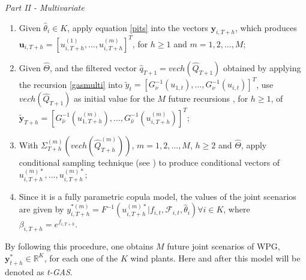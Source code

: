 \documentclass[a4paper]{IEEEtran}
\begin{document}
\emph{Part II - Multivariate}
\begin{enumerate}\label{multivariate_modelling}

\item Given $\hat{\theta}_i \in K$, apply equation \eqref{pits} into the vectors $\mathbf{y}_{i,T+h}$, which produces $\mathbf{u}_{i,T+h} = [u_{i,T+h}^{(1)},...,u_{i,T+h}^{(m)}]^T$, for $h \geq 1$ and $m=1,2,...,M$; \label{step1_multi} %

\item Given $\hat{\Theta}$, and the filtered vector $\hat{q}_{T+1} = vech(\hat{Q}_{T+1})$ obtained by applying the recursion \eqref{gasmulti} into $\tilde{y}_{t}=[G_{\nu}^{-1}(u_{1,t}), ..., G_{\nu}^{-1}(u_{i,t})]^T$, use $vech(\hat{Q}_{T+1})$ as initial value for the $M$ future recursions , for $h \geq 1$, of  $\mathbf{\tilde{y}}_{T+h} = [G^{-1}_{\hat{\nu}}(u_{1,T+h}^{(m)}),...,G^{-1}_{\hat{\nu}}(u_{i,T+h}^{(m)})]^T$; \label{step2_multi}


\item With $\Sigma_{T+h}^{(m)}(vech(\hat{Q}_{T+h}^{(m)}))$, $m=1,2,...,M$, $h \geq 2$ and $\hat{\Theta}$, apply conditional sampling technique (see \cite{cherubini2004copula}) to produce conditional vectors of ${u}_{i,T+h}^{(m)*},...,{u}_{i,T+h}^{(m)*}$; \label{step3_multi}

\item Since it is a fully parametric copula model, the values of the joint scenarios are given by $y^{*(m)}_{i,T+h}=F^{-1}(u_{i,T+h}^{(m)*}| f_{i,t},\mathcal{F}_{i,t},\hat{\theta}_{i}) \forall i \in K$, where $\beta_{i,T+h}=e^{f_{i,T+h}}$. \label{step4_multi}

\end{enumerate}

By following this procedure, one obtains $M$ future joint scenarios of WPG, $\mathbf{y}_{t+h}^{*} \in \mathbb{R}^K$, for each one of the $K$ wind plants. Here and after this model will be denoted as \emph{t-GAS}.


\end{document}
